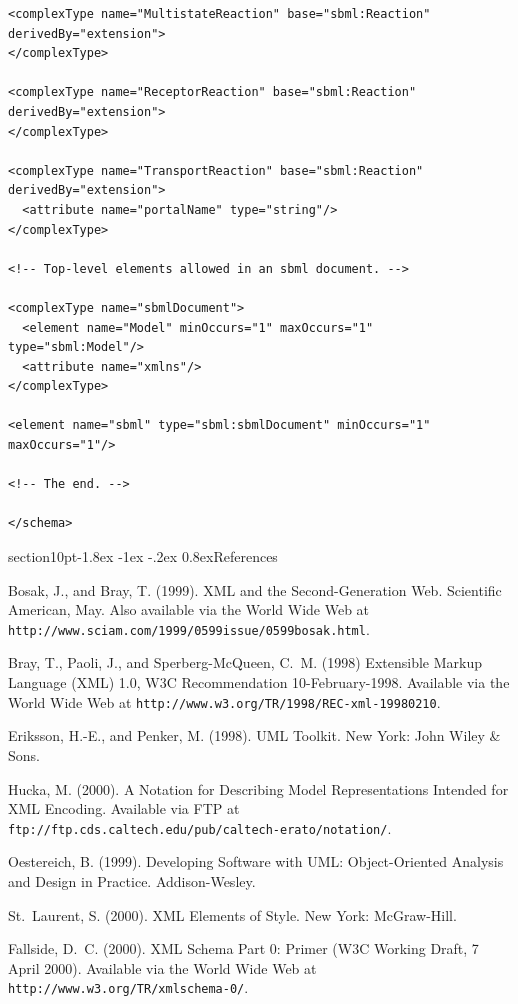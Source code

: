 \documentclass[10pt]{article}
\makeatletter
\renewcommand{\section}{\@startsection%
  {section}{1}{0pt}{-1.8ex \@plus -1ex \@minus -.2ex}%
  {0.8ex}{\normalfont\Large\bfseries}}
\newcommand{\regularspacing}{\renewcommand{\baselinestretch}{1.0}}
\newcommand{\url}[1]{\textup{\texttt{#1}}}
\newcommand{\notationdocloc}{\url{ftp://ftp.cds.caltech.edu/pub/caltech-erato/notation/}}
\makeatother
\begin{document}
\begin{small}
\begin{verbatim}
<complexType name="MultistateReaction" base="sbml:Reaction" derivedBy="extension">
</complexType>

<complexType name="ReceptorReaction" base="sbml:Reaction" derivedBy="extension">
</complexType>

<complexType name="TransportReaction" base="sbml:Reaction" derivedBy="extension">
  <attribute name="portalName" type="string"/>
</complexType>

<!-- Top-level elements allowed in an sbml document. -->

<complexType name="sbmlDocument">
  <element name="Model" minOccurs="1" maxOccurs="1" type="sbml:Model"/>
  <attribute name="xmlns"/>
</complexType>

<element name="sbml" type="sbml:sbmlDocument" minOccurs="1" maxOccurs="1"/>

<!-- The end. -->

</schema>
\end{verbatim}
\regularspacing
\end{small}



\setcounter{secnumdepth}{-1}
\section{References}

\setlength{\parskip}{1.2ex}

\begin{flushleft}

Bosak, J., and Bray, T. (1999).  {XML} and the Second-Generation Web.
Scientific American, May.  Also available via the World Wide Web at
\url{http://www.sciam.com/1999/0599issue/0599bosak.html}.

Bray, T., Paoli, J., and Sperberg-McQueen, C.~M. (1998) Extensible Markup
Language (XML) 1.0, W3C Recommendation 10-February-1998.  Available via the
World Wide Web at \url{http://www.w3.org/TR/1998/REC-xml-19980210}.

Eriksson, H.-E., and Penker, M. (1998).  UML Toolkit.  New York: John Wiley
\& Sons.

Hucka, M. (2000).  A Notation for Describing Model Representations Intended
for XML Encoding.  Available via FTP at \notationdocloc{}.

Oestereich, B.  (1999).  Developing Software with UML: Object-Oriented
Analysis and Design in Practice.  Addison-Wesley.

St.~Laurent, S. (2000).  XML Elements of Style.  New York: McGraw-Hill.

Fallside, D.~C.  (2000).  XML Schema Part 0: Primer (W3C Working Draft, 7
April 2000).  Available via the World Wide Web at
\url{http://www.w3.org/TR/xmlschema-0/}.

\end{flushleft}

\end{document}
